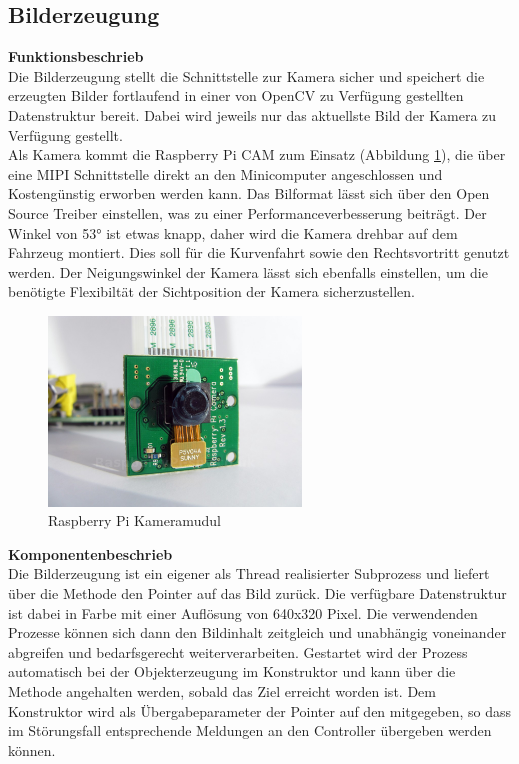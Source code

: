 \subsection{Bilderzeugung}
\textbf{Funktionsbeschrieb}\\[0.2cm]
Die Bilderzeugung stellt die Schnittstelle zur Kamera sicher und speichert die erzeugten Bilder fortlaufend in einer von OpenCV zu Verfügung gestellten Datenstruktur bereit. Dabei wird jeweils nur das aktuellste Bild der Kamera zu Verfügung gestellt.\\
Als Kamera kommt die Raspberry Pi CAM zum Einsatz (Abbildung \ref{fig:camera}), die über eine MIPI Schnittstelle direkt an den Minicomputer angeschlossen und Kostengünstig erworben werden kann. Das Bilformat lässt sich über den Open Source Treiber einstellen, was zu einer Performanceverbesserung beiträgt. Der Winkel von 53° ist etwas knapp, daher wird die Kamera drehbar auf dem Fahrzeug montiert. Dies soll für die Kurvenfahrt sowie den Rechtsvortritt genutzt werden. Der Neigungswinkel der Kamera lässt sich ebenfalls einstellen, um die benötigte Flexibiltät der Sichtposition der Kamera sicherzustellen.
\begin{figure}[H]
\centering
\includegraphics[width=0.6\textwidth]{03_Loesungskonzept/pictures/raspberry-pi-camera-module.jpg}
\caption{Raspberry Pi Kameramudul}
\label{fig:camera}
\end{figure}
\textbf{Komponentenbeschrieb}\\[0.2cm]
Die Bilderzeugung ist ein eigener als Thread realisierter Subprozess und liefert über die Methode  den Pointer auf das Bild zurück. Die verfügbare Datenstruktur ist dabei  in Farbe mit einer Auflösung von 640x320 Pixel. Die verwendenden Prozesse können sich dann den Bildinhalt zeitgleich und unabhängig voneinander abgreifen und bedarfsgerecht weiterverarbeiten. Gestartet wird der Prozess automatisch bei der Objekterzeugung im Konstruktor und kann über die Methode  angehalten werden, sobald das Ziel erreicht worden ist. Dem Konstruktor wird als Übergabeparameter der Pointer auf den  mitgegeben, so dass im Störungsfall entsprechende Meldungen an den Controller übergeben werden können.\\[0.2cm]
